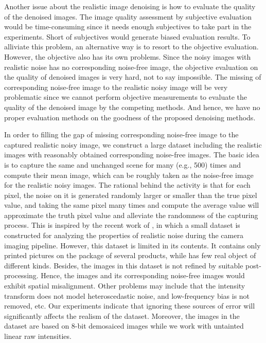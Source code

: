 Another issue about the realistic image denoising is how to evaluate the quality of the denoised images. The image quality assessment by subjective evaluation would be time-consuming since it needs enough subjectives to take part in the experiments. Short of subjectives would generate biased evaluation results. To alliviate this problem, an alternative way is to resort to the objective evaluation. However, the objective also has its own problems. Since the noisy images with realistic noise has no corresponding noise-free image, the objective evaluation on the quality of denoised images is very hard, not to say impossible. The missing of corresponding noise-free image to the realistic noisy image will be very problematic since we cannot perform objective measurements to evaluate the quality of the denoised image by the competing methods. And hence, we have no proper evaluation methods on the goodness of the proposed denoising methods.

In order to filling the gap of missing corresponding noise-free image to the captured realistic noisy image, we construct a large dataset including the realistic images with reasonably obtained corresponding noise-free images. The basic idea is to capture the same and unchanged scene for many (e.g., 500) times and compute their mean image, which can be roughly taken as the noise-free image for the realistic noisy images. The rational behind the activity is that for each pixel, the noise on it is generated randomly larger or smaller than the true pixel value, and taking the same pixel many times and compute the average value will approximate the truth pixel value and alleviate the randomness of the capturing process. This is inspired by the recent work of \cite{crosschannel2016}, in which a small dataset is constructed for analyzing the properties of realistic noise during the camera imaging pipeline. However, this dataset is limited in its contents. It contains only printed pictures on the package of several products, while has few real object of different kinds. Besides, the images in this dataset is not refined by suitable post-processing. Hence, the images and its corresponding noise-free images would exhibit spatial misalignment. Other problems may include that the intensity transform does not model heteroscedastic noise, and low-frequency bias is not removed, etc. Our experiments
indicate that ignoring these sources of error will significantly affects the realism of the dataset. Moreover, the images in the dataset \cite{crosschannel2016} are based on $8$-bit demosaiced images while we work with untainted linear raw intensities.

